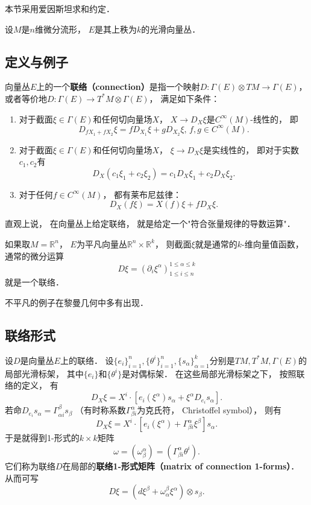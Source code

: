
本节采用爱因斯坦求和约定．

设$M$是$n$维微分流形， $E$是其上秩为$k$的光滑向量丛． 

\subsection{定义与例子}
向量丛$E$上的一个\textbf{联络（connection）}是指一个映射$D:\Gamma(E)\otimes TM\to\Gamma(E)$， 或者等价地$D:\Gamma(E)\to T^*M\otimes\Gamma(E)$， 满足如下条件：

\begin{enumerate}
\item 对于截面$\xi\in\Gamma(E)$和任何切向量场$X$， $X\to D_X\xi$是$C^\infty(M)$-线性的， 即
$$
D_{fX_1+fX_2}\xi=fD_{X_1}\xi+gD_{X_2}\xi,\,f,g\in C^\infty(M).
$$
\item 对于截面$\xi\in\Gamma(E)$和任何切向量场$X$， $\xi\to D_X\xi$是实线性的， 即对于实数$c_1,c_2$有
$$
D_X(c_1\xi_1+c_2\xi_2)=c_1D_X\xi_1+c_2D_X\xi_2.
$$
\item 对于任何$f\in C^\infty(M)$， 都有莱布尼兹律：
$$
D_X(f\xi)=X(f)\xi+fD_X\xi.
$$
\end{enumerate}

直观上说， 在向量丛上给定联络， 就是给定一个"符合张量规律的导数运算"． 

如果取$M=\mathbb{R}^n$， $E$为平凡向量丛$\mathbb{R}^n\times\mathbb{R}^k$， 则截面$\xi$就是通常的$k$-维向量值函数， 通常的微分运算
$$
D\xi=(\partial_i\xi^\alpha)_{1\leq i\leq n}^{1\leq\alpha\leq k}
$$
就是一个联络．

不平凡的例子在黎曼几何中多有出现．

\subsection{联络形式}
设$D$是向量丛$E$上的联络． 设$\{e_i\}_{i=1}^n,\{\theta^i\}_{i=1}^n,\{s_\alpha\}_{\alpha=1}^k$分别是$TM,T^*M,\Gamma(E)$的局部光滑标架， 其中$\{e_i\}$和$\{\theta^i\}$是对偶标架． 在这些局部光滑标架之下， 按照联络的定义， 有
$$
D_X\xi=X^i\cdot\left[e_i(\xi^\alpha)s_\alpha+\xi^\alpha D_{e_i}s_\alpha\right].
$$
若命$D_{e_i}s_\alpha=\Gamma_{\alpha i}^\beta s_\beta$ （有时称系数$\Gamma^\alpha_{\beta i}$为克氏符， Christoffel symbol）， 则有
$$
D_X\xi=X^i\cdot\left[e_i(\xi^\alpha)+\Gamma_{\beta i}^\alpha\xi^\beta \right]s_\alpha.
$$
于是就得到1-形式的$k\times k$矩阵
$$
\omega=(\omega_\beta^\alpha)=(\Gamma_{\beta i}^\alpha\theta^i).
$$
它们称为联络$D$在局部的\textbf{联络1-形式矩阵（matrix of connection 1-forms）}． 从而可写
$$
D\xi=(d\xi^\beta+\omega_\alpha^\beta\xi^\alpha)\otimes s_\beta.
$$

